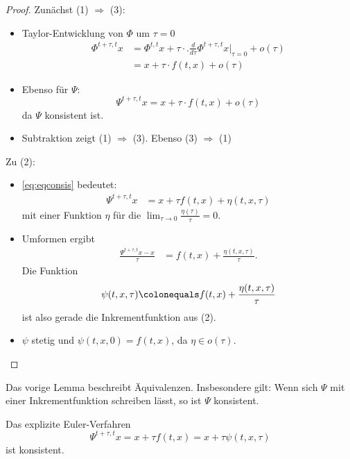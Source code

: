 \begin{proof}
	Zunächst (1) $\Rightarrow$ (3):
	\begin{itemize}
		\item Taylor-Entwicklung von $\Phi$ um $\tau=0$
		\begin{align*}
			\Phi^{t+\tau,t} x & = \Phi^{t,t} x+\tau \cdot . \frac{d}{d \tau} \Phi^{t+\tau,t} x |_{\tau=0}+o(\tau) \\
			& = x+\tau \cdot f(t,x)+o(\tau)
		\end{align*}
		
		\item Ebenso für $\Psi$:
		\begin{equation} \label{eq:eqconsis}
			\Psi^{t+\tau,t} x=x+\tau \cdot f(t,x)+o(\tau)
		\end{equation}
		da $\Psi$ konsistent ist.
		
		\item Subtraktion zeigt (1) $\Rightarrow$ (3). Ebenso (3) $\Rightarrow$ (1)
	\end{itemize}
	Zu (2):
	\begin{itemize}
		\item \eqref{eq:eqconsis} bedeutet:
		\begin{align*}
			\Psi^{t+\tau,t} x & =x+\tau f(t,x) +\eta (t,x,\tau)
		\end{align*}
		mit einer Funktion $\eta$ für die $\lim_{\tau \to 0} \frac{\eta(\tau)}{\tau}=0$.
		
		\item Umformen ergibt
		\begin{align*}
			\frac{\Psi^{t+\tau,t} x-x}{\tau} & =f(t,x)+\frac{\eta (t,x,\tau)}{\tau}.
		\end{align*}
		Die Funktion
		\begin{align*}
			 \psi (t,x,\tau) \colonequals f(t,x)+\frac{\eta (t,x,\tau)}{\tau}
		\end{align*}
		ist also gerade die Inkrementfunktion aus (2).
		
		\item $\psi$ stetig und $\psi (t,x,0)=f(t,x)$, da $\eta \in o(\tau)$.
	\end{itemize}
\end{proof}

Das vorige Lemma beschreibt Äquivalenzen. Insbesondere gilt: Wenn sich $\Psi$ mit einer Inkrementfunktion schreiben lässt, so ist $\Psi$ konsistent.

\begin{bsp}
	Das explizite Euler-Verfahren
	\begin{equation*}
		\Psi^{t+\tau,t} x=x+ \tau f(t,x)=x+ \tau \psi (t,x,\tau)
	\end{equation*}
	ist konsistent.
\end{bsp}

